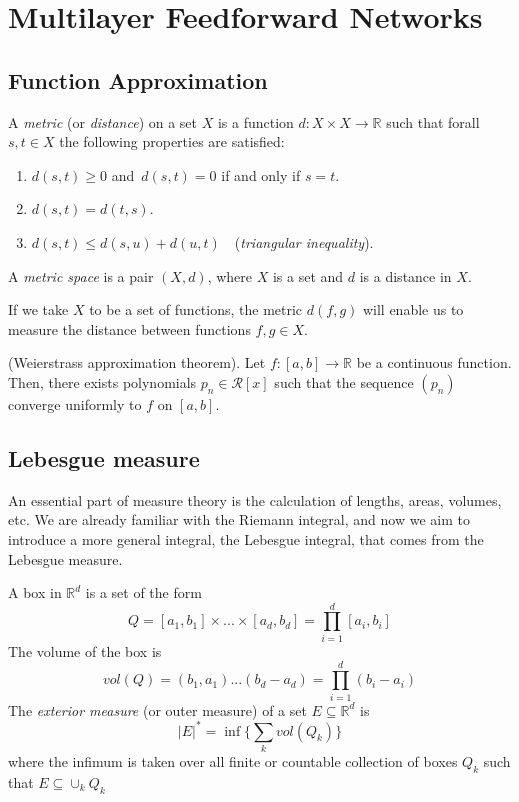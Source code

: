 \documentclass[../main.tex]{subfiles}
\begin{document}
\chapter{Multilayer Feedforward Networks} \label{ch:methods}
\section{Function Approximation}
\begin{definition}
	A \emph{metric} (or \emph{distance}) on a set $X$ is a function $d:X\times X\rightarrow \mathbb{R} $ such that forall $s,t\in X$ the following properties are satisfied:
	\begin{enumerate}
		\item $d(s,t) \geq 0$ and $ \, d(s,t)=0$ if and only if $ s=t$.
		\item $d(s,t)=d(t,s)$.
		\item $d(s,t)\leq d(s,u)+d(u,t)\quad$(\emph{triangular inequality}).
	\end{enumerate}
A \emph{metric space} is a pair $(X,d)$, where $X$ is a set and $d$ is a distance in $X$.
\end{definition}

\begin{definition}
If we take $X$ to be a set of functions, the metric $d(f,g)$ will enable us to measure the distance between functions $f,g \in X$.
\end{definition}


\begin{theorem}(Weierstrass  approximation theorem). 
	Let $f:[a,b]\rightarrow \mathbb{R} $ be a continuous function. Then, there exists polynomials $p_n\in \mathcal{R}[x]$ such that the sequence $(p_n)$ converge uniformly to $f$ on $[a,b]$. 
\end{theorem} 
\section{Lebesgue measure}
\noindent An essential part of measure theory is the calculation of lengths, areas, volumes, etc. We are already familiar with the Riemann integral, and now we aim to introduce a more general integral, the Lebesgue integral, that comes from the Lebesgue measure. 

\begin{definition} A box in $\mathbb{R}^d$ is a set of the form 
	$$ Q = [a_1,b_1]  \times ... \times [a_d,b_d] = \prod_{i=1}^d [a_i,b_i]$$
	The volume of the box is $$ vol(Q)= (b_1,a_1) ... (b_d-a_d)= \prod_{i=1}^d (b_i-a_i)$$
	The \emph{exterior measure} (or outer measure) of a set $E\subseteq \mathbb{R}^d$ is $$ |E|^* = \inf\{\sum_k vol(Q_k)\} $$ 
	where the infimum is taken over all finite or countable collection of boxes $Q_k$ such that $E \subseteq \cup_k Q_k$
\end{definition}
\end{document}
